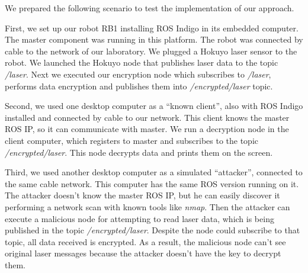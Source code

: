 \documentclass[journal,twoside]{JoPhA}
\begin{document}
 
We prepared the following scenario to test the implementation of our approach.


First, we set up our robot RB1 installing ROS Indigo in its embedded computer. The master component was running in this platform. The robot was connected by cable to the network of our laboratory. We plugged a Hokuyo laser sensor to the robot. We launched the Hokuyo node that publishes laser data to the topic \textit{/laser}. Next we executed our encryption node which subscribes to \textit{/laser}, performs data encryption and publishes them into \textit{/encrypted/laser} topic.

Second, we used one desktop computer as a ``known client'', also with ROS Indigo installed and connected by cable to our network. This client knows the master ROS IP, so it can communicate with master. We run a decryption node in the client computer, which registers to master and subscribes to the topic \textit{/encrypted/laser}. This node decrypts data and prints them on the screen.

Third, we used another desktop computer as a simulated ``attacker'', connected to the same  cable network. This computer has the same ROS version running on it. The attacker doesn't know the master ROS IP, but he can easily discover it performing a network scan with known tools like \textit{nmap}. Then the attacker can execute a malicious node for attempting to read laser data, which is being published in the topic \textit{/encrypted/laser}. Despite the node could subscribe to that topic, all data received is encrypted. As a result, the malicious node can't see original laser messages because the attacker doesn't have the key to decrypt them. 

\end{document}
